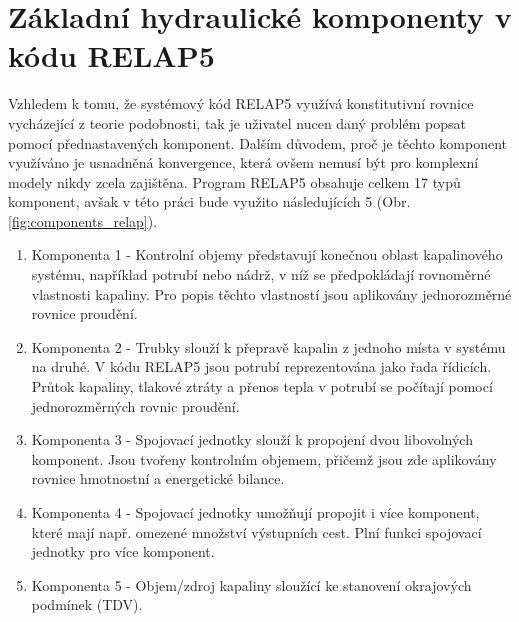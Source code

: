 \section{Základní hydraulické komponenty v kódu RELAP5}
Vzhledem k tomu, že systémový kód RELAP5 využívá konstitutivní rovnice vycházející z teorie podobnosti, tak je uživatel nucen daný problém popsat pomocí přednastavených komponent. Dalším důvodem, proč je těchto komponent využíváno je usnadněná konvergence, která ovšem nemusí být pro komplexní modely nikdy zcela zajištěna. Program RELAP5 obsahuje celkem 17 typů komponent, avšak v této práci bude využito následujících 5 (Obr. \ref{fig:components_relap}). 
\begin{enumerate}
	\item Komponenta 1 - Kontrolní objemy představují konečnou oblast kapalinového systému, například potrubí nebo nádrž, v níž se předpokládají rovnoměrné vlastnosti kapaliny. Pro popis těchto vlastností jsou aplikovány jednorozměrné rovnice proudění.
	\item Komponenta 2 - Trubky slouží k přepravě kapalin z jednoho místa v systému na druhé. V kódu RELAP5 jsou potrubí reprezentována jako řada řídicích. Průtok kapaliny, tlakové ztráty a přenos tepla v potrubí se počítají pomocí jednorozměrných rovnic proudění.
	\item Komponenta 3 - Spojovací jednotky slouží k propojení dvou libovolných komponent. Jsou tvořeny kontrolním objemem, přičemž jsou zde aplikovány rovnice hmotnostní a energetické bilance.
	\item Komponenta 4 - Spojovací jednotky umožňují propojit i více komponent, které mají např. omezené množství výstupních cest. Plní funkci spojovací jednotky pro více komponent.
	\item Komponenta 5 - Objem/zdroj kapaliny sloužící ke stanovení okrajových podmínek (TDV).
	
\end{enumerate}  


